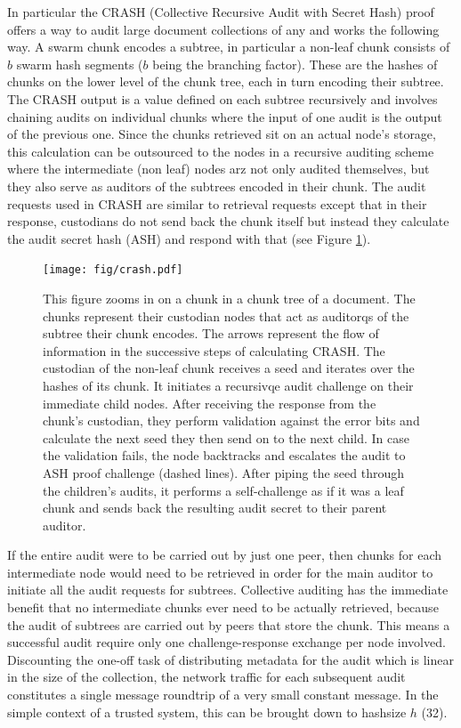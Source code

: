 \documentclass[12pt]{article}
\begin{document}
{In particular the CRASH (Collective Recursive Audit with Secret Hash) proof offers a way to audit large document collections of any and works the following way.
A swarm chunk encodes a subtree, in particular a non-leaf chunk consists of $b$ swarm hash segments ($b$ being the branching factor). These are the hashes of chunks on the lower level of the chunk tree, each in turn encoding their subtree. The CRASH output is a value defined on each subtree recursively and involves chaining audits on individual chunks where the input of one audit is the output of the previous one.
Since the chunks retrieved sit on an actual node's storage, this calculation can be outsourced to the nodes in a recursive auditing scheme where the intermediate (non leaf) nodes arz not only audited themselves, but they also serve as auditors of the subtrees encoded in their chunk. The audit requests used in CRASH are similar to retrieval requests except that in their response, custodians do not send back the chunk itself but instead they calculate the audit secret hash (ASH) and respond with that (see Figure \ref{fig:crash}).

\begin{figure}[htbp]
   \centering
   \texttt{[image: fig/crash.pdf]} %
   \caption{This figure zooms in on a chunk in a chunk tree of a document. The chunks represent their custodian nodes that act as auditorqs of the subtree their chunk encodes. The arrows represent the flow of information in the successive steps of calculating CRASH. The custodian of the non-leaf chunk receives a seed and iterates over the hashes of its chunk. It initiates a recursivqe audit challenge on their immediate child nodes. After receiving the response from the chunk's custodian, they perform validation against the error bits and calculate the next seed they then send on to the next child. In case the validation fails, the node backtracks and escalates the audit  to ASH proof challenge    (dashed lines). After piping the seed through the children's audits, it performs a self-challenge as if it was a leaf chunk and sends back the resulting audit secret to their parent auditor.
   }
   \label{fig:crash}
\end{figure}

If the entire audit were to be carried out by just one peer, then chunks for each intermediate node would need to be retrieved in order for the main auditor to initiate all the audit requests for subtrees. Collective auditing has the immediate benefit that no intermediate chunks ever need to be actually retrieved, because the audit of subtrees are carried out by peers that store the chunk. This means a successful audit require only one challenge-response exchange per node involved.
Discounting the one-off task of distributing metadata for the audit which is linear in the size of the collection, the network traffic for each subsequent audit
constitutes a single message roundtrip of a very small constant message.
In the simple context of a trusted system, this can be brought down to hashsize $h$ (32).

}
\end{document}
